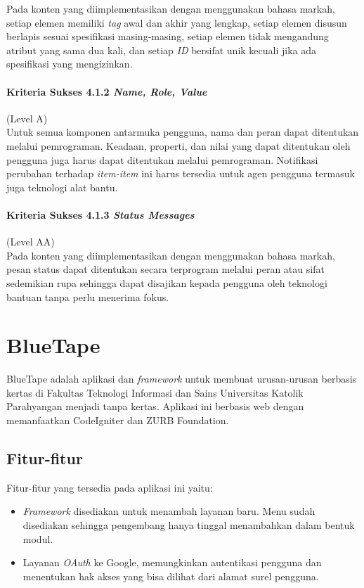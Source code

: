 Pada konten yang diimplementasikan dengan menggunakan bahasa markah, setiap elemen memiliki \textit{tag} awal dan akhir yang lengkap, setiap elemen disusun berlapis sesuai spesifikasi masing-masing, setiap elemen tidak mengandung atribut yang sama dua kali, dan setiap \textit{ID} bersifat unik kecuali jika ada spesifikasi yang mengizinkan.

\paragraph{Kriteria Sukses 4.1.2 \textit{Name, Role, Value}}
\label{sec:kriteria_sukses_4.1.2}
(Level A)\\

Untuk semua komponen antarmuka pengguna, nama dan peran dapat ditentukan melalui pemrograman. Keadaan, properti, dan nilai yang dapat ditentukan oleh pengguna juga harus dapat ditentukan melalui pemrograman. Notifikasi perubahan terhadap \textit{item-item} ini harus tersedia untuk agen pengguna termasuk juga teknologi alat bantu.

\paragraph{Kriteria Sukses 4.1.3 \textit{Status Messages}}
\label{sec:kriteria_sukses_4.1.3}
(Level AA)\\

Pada konten yang diimplementasikan dengan menggunakan bahasa markah, pesan status dapat ditentukan secara terprogram melalui peran atau sifat sedemikian rupa sehingga dapat disajikan kepada pengguna oleh teknologi bantuan tanpa perlu menerima fokus.



\section{BlueTape}
\label{sec:bluetape}
BlueTape adalah aplikasi dan \textit{framework} untuk membuat urusan-urusan berbasis kertas di Fakultas Teknologi Informasi dan Sains Universitas Katolik Parahyangan menjadi tanpa kertas. Aplikasi ini berbasis web dengan memanfaatkan CodeIgniter dan ZURB Foundation.

\subsection{Fitur-fitur}
Fitur-fitur yang tersedia pada aplikasi ini yaitu:
\begin{itemize}
	\item \textit{Framework} disediakan untuk menambah layanan baru. Menu sudah disediakan sehingga pengembang hanya tinggal menambahkan dalam bentuk modul.
	\item Layanan \textit{OAuth} ke Google, memungkinkan autentikasi pengguna dan menentukan hak akses yang bisa dilihat dari alamat surel pengguna.
\end{itemize}


